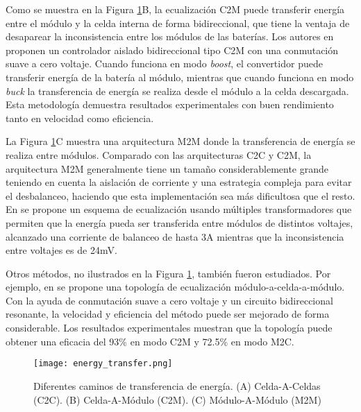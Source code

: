 Como se muestra en la Figura \ref{energy_transfer}B, la ecualizaci\'on
\acrshort{C2M} puede transferir energ\'ia entre el m\'odulo  y la celda interna
de forma bidireccional, que tiene la ventaja de desaparear la inconsistencia
entre los m\'odulos de las bater\'ias. Los autores en \cite{lu_et_al_bal} 
proponen un controlador aislado bidireccional tipo \acrshort{C2M} con una 
conmutaci\'on suave a cero voltaje. Cuando funciona en modo \emph{boost}, el 
convertidor puede transferir energ\'ia de la bater\'ia al m\'odulo, mientras que 
cuando funciona en modo \emph{buck} la transferencia de energ\'ia se realiza 
desde el m\'odulo a la celda descargada. Esta metodolog\'ia demuestra 
resultados experimentales con buen rendimiento tanto en velocidad como 
eficiencia.

La Figura \ref{energy_transfer}C muestra una arquitectura \acrshort{M2M}
donde la transferencia de energ\'ia se realiza entre m\'odulos. Comparado con
las arquitecturas \acrshort{C2C} y \acrshort{C2M}, la arquitectura 
\acrshort{M2M} generalmente tiene un tamaño considerablemente grande teniendo en 
cuenta la aislaci\'on de corriente y una estrategia compleja para evitar el 
desbalanceo, haciendo que esta implementaci\'on sea m\'as dificultosa que el 
resto. En \cite{ji_et_al_bal_mod} se propone un esquema de ecualizaci\'on usando 
m\'ultiples transformadores que permiten que la energ\'ia pueda ser transferida 
entre m\'odulos de distintos voltajes, alcanzado una corriente de balanceo de 
hasta 3A mientras que la inconsistencia entre voltajes es de 24mV.

Otros m\'etodos, no ilustrados en la Figura \ref{energy_transfer}, tambi\'en
fueron estudiados. Por ejemplo, en \cite{li_et_al_bal} se propone una 
topolog\'ia de ecualizaci\'on m\'odulo-a-celda-a-m\'odulo. Con la ayuda de 
conmutaci\'on suave a cero voltaje y un circuito bidireccional resonante, la 
velocidad y eficiencia del m\'etodo puede ser mejorado de forma considerable. 
Los resultados experimentales muestran que la topolog\'ia puede obtener una 
eficacia del 93\% en modo \acrshort{C2M} y 72.5\% en modo \acrshort{M2C}.

\begin{figure}[h!]
    \begin{center}
        \texttt{[image: energy\_transfer.png]}
        \caption{Diferentes caminos de transferencia de energ\'ia. (A)
        Celda-A-Celdas (\acrshort{C2C}). (B) Celda-A-M\'odulo (\acrshort{C2M}).
        (C) M\'odulo-A-M\'odulo (\acrshort{M2M})} 
        \label{energy_transfer}
    \end{center}
\end{figure}

